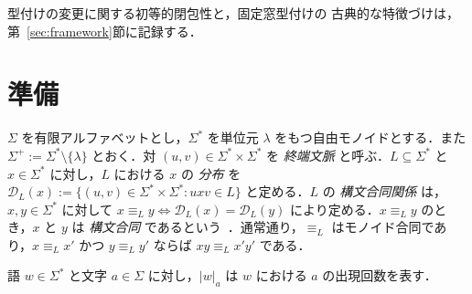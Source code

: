 \documentclass[11pt,a4paper]{ltjsarticle}
\theoremstyle{remark}
\theoremstyle{plain}
\newcommand{\D}{\mathcal{D}}
\begin{document}
型付けの変更に関する初等的閉包性と，固定窓型付けの
古典的な特徴づけは，第~\ref{sec:framework}節に記録する．

\section{準備}
\label{sec:prelim}

$\Sigma$ を有限アルファベットとし，$\Sigma^*$ を単位元 $\lambda$ をもつ自由モノイドとする．また $\Sigma^+:=\Sigma^*\setminus\{\lambda\}$ とおく．対 $(u,v)\in\Sigma^*\times\Sigma^*$ を \emph{終端文脈} と呼ぶ．$L\subseteq\Sigma^*$ と $x\in\Sigma^*$ に対し，$L$ における $x$ の \emph{分布} を
$\D_L(x):=\{(u,v)\in\Sigma^*\times\Sigma^*:uxv\in L\}$
と定める．$L$ の \emph{構文合同関係} は，$x,y\in\Sigma^*$ に対して $x\equiv_L y \Longleftrightarrow \D_L(x)=\D_L(y)$ により定める．$x\equiv_L y$ のとき，$x$ と $y$ は \emph{構文合同} であるという~\cite[Chapter~III, Proposition~10.2]{eilenberg1974}．通常通り，$\equiv_L$ はモノイド合同であり，$x\equiv_L x'$ かつ $y\equiv_L y'$ ならば $xy\equiv_L x'y'$ である．

語 $w\in\Sigma^*$ と文字 $a\in\Sigma$ に対し，$|w|_a$ は $w$ における $a$ の出現回数を表す．
\end{document}
